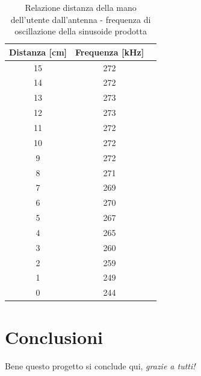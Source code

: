 \documentclass[titlepage]{report}
\begin{document}
	\begin{table}[h!]
		\centering
		\begin{tabular}{||c|c|c||}
			\hline
			\cellcolor{gray!10}Distanza [cm] & \cellcolor{gray!10}Frequenza [kHz] \\
			\hline
			15 & 272 \\
			\hline
			14 & 272 \\
			\hline
			13 & 273 \\
			\hline
			12 & 273 \\
			\hline
			11 & 272 \\
			\hline
			10 & 272 \\
			\hline		
			9 &  272 \\
			\hline
			8 &  271 \\
			\hline
			7 &  269 \\
			\hline
		    6 &  270 \\
			\hline
			5 &  267 \\
			\hline
			4 &  265 \\
			\hline
			3 &  260 \\
			\hline
			2 &  259 \\
			\hline
			1 &  249 \\
			\hline
			0 &  244 \\
			\hline
		\end{tabular}
		\caption{Relazione distanza della mano dell'utente dall'antenna - frequenza di oscillazione della sinusoide prodotta}
		\label{tab:Distanza-Frequenza}
	\end{table}
	

	

\chapter{Conclusioni}
 	\label{ch:Conclusioni}
	Bene questo progetto si conclude qui, \textit{grazie a tutti!}
	




	
\end{document}
